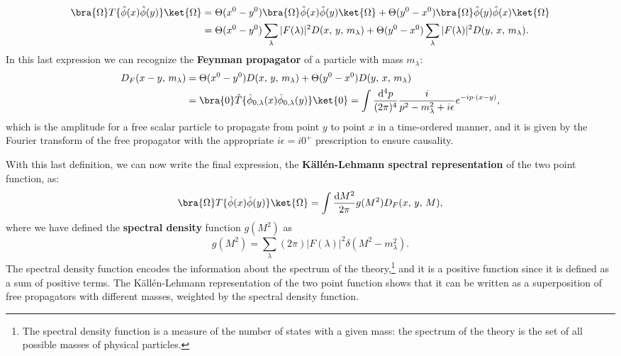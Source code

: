 \[
    \begin{aligned}
        \bra{\Omega} T \{ \hat{\phi}(x) \hat{\phi}(y) \} \ket{\Omega} & = \Theta(x^0 - y^0) \bra{\Omega} \hat{\phi}(x) \hat{\phi}(y) \ket{\Omega} + \Theta(y^0 - x^0) \bra{\Omega} \hat{\phi}(y) \hat{\phi}(x) \ket{\Omega}                \\
                                                                      & = \Theta(x^0 - y^0) \sum_{\lambda} \vert F(\lambda) \vert^2 D(x,\,y,\,m_\lambda) + \Theta(y^0 - x^0) \sum_{\lambda} \vert F(\lambda) \vert^2 D(y,\,x,\,m_\lambda).
    \end{aligned}
\]
In this last expression we can recognize the \textbf{Feynman propagator} of a particle with mass \(m_\lambda\):
\begin{equation}
    \begin{aligned}
        D_F(x-y,\,m_\lambda) & = \Theta(x^0 - y^0) D(x,\,y,\,m_\lambda) + \Theta(y^0 - x^0) D(y,\,x,\,m_\lambda)                                                                                                    \\
                             & = \bra{0} \hat{T}\{\hat{\phi}_{0,\lambda}(x) \hat{\phi}_{0,\lambda}(y)\} \ket{0} = \int \frac{\mathrm{d}^4 p}{(2\pi)^4} \frac{i}{p^2 - m_\lambda^2 + i\epsilon} e^{-ip \cdot (x-y)},
    \end{aligned}
    \label{eq:Feynman_propagator}
\end{equation}
which is the amplitude for a free scalar particle to propagate from point \(y\) to point \(x\) in a time-ordered manner, and it is given by the Fourier transform of the free propagator with the appropriate \(i\epsilon = i0^{+}\) prescription to ensure causality.

With this last definition, we can now write the final expression, the \textbf{Källén-Lehmann spectral representation} of the two point function, as:
\begin{equation}
    \bra{\Omega} T \{ \hat{\phi}(x) \hat{\phi}(y) \} \ket{\Omega} = \int \frac{\mathrm{d} M^2}{2\pi} g(M^2) D_F(x,\,y,\,M),
    \label{eq:Kallen_Lehmann_representation}
\end{equation}
where we have defined the \textbf{spectral density} function \(g(M^2)\) as
\begin{equation}
    g(M^2) = \sum_{\lambda} (2\pi) \vert F(\lambda) \vert^2 \delta(M^2 - m_\lambda^2).
    \label{eq:spectral_density_function}
\end{equation}
The spectral density function encodes the information about the spectrum of the theory,\footnote{The spectral density function is a measure of the number of states with a given mass: the spectrum of the theory is the set of all possible masses of physical particles.} and it is a positive function since it is defined as a sum of positive terms. The Källén-Lehmann representation of the two point function shows that it can be written as a superposition of free propagators with different masses, weighted by the spectral density function.

